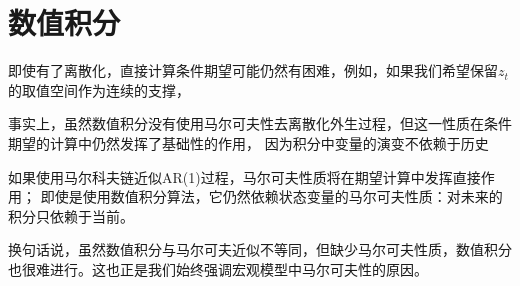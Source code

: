 
\section{数值积分}  \label{sec-numerical-integeration}

即使有了离散化，直接计算条件期望可能仍然有困难，例如，如果我们希望保留$z_t$的取值空间作为连续的支撑，


事实上，虽然数值积分没有使用马尔可夫性去离散化外生过程，但这一性质在条件期望的计算中仍然发挥了基础性的作用，
因为积分中变量的演变不依赖于历史

如果使用马尔科夫链近似AR(1)过程，马尔可夫性质将在期望计算中发挥直接作用；
即使是使用数值积分算法，它仍然依赖状态变量的马尔可夫性质：对未来的积分只依赖于当前。

换句话说，虽然数值积分与马尔可夫近似不等同，但缺少马尔可夫性质，数值积分也很难进行。这也正是我们始终强调宏观模型中马尔可夫性的原因。